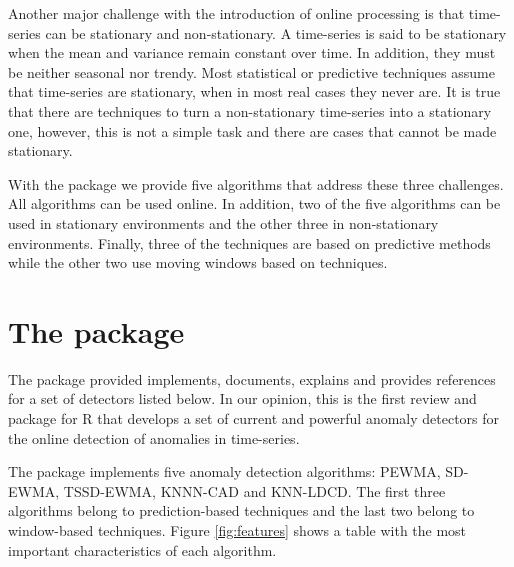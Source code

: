 \documentclass[a4paper]{article}\usepackage[]{graphicx}\usepackage[]{color}
\begin{document}
Another major challenge with the introduction of online processing is that time-series can be stationary and non-stationary. A time-series is said to be stationary when the mean and variance remain constant over time. In addition, they must be neither seasonal nor trendy. Most statistical or predictive techniques assume that time-series are stationary, when in most real cases they never are. It is true that there are techniques to turn a non-stationary time-series into a stationary one, however, this is not a simple task and there are cases that cannot be made stationary.

With the  package we provide five algorithms that address these three challenges. All algorithms can be used online. In addition, two of the five algorithms can be used in stationary environments and the other three in non-stationary environments. Finally, three of the techniques are based on predictive methods while the other two use moving windows based on techniques.

\section{The  package}\label{sec:package}

The package provided implements, documents, explains and provides references for a set of detectors listed below. In our opinion, this is the first review and package for R that develops a set of current and powerful anomaly detectors for the online detection of anomalies in time-series.

The  package implements five anomaly detection algorithms: PEWMA, SD-EWMA, TSSD-EWMA, KNNN-CAD and KNN-LDCD. The first three algorithms belong to prediction-based techniques and the last two belong to window-based techniques. Figure \ref{fig:features} shows a table with the most important characteristics of each algorithm.
\end{document}
